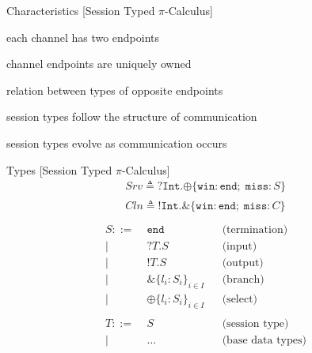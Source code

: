 \documentclass[dvipsnames]{beamer}
\newcommand{\Picalc}{$\pi$-Calculus}
\newcommand{\type}[1]{\mathtt{#1}}
\newcommand{\tend}[0]{\type{end}}
\newcommand{\trecv}[1]{\type{?} #1 \type{.}}
\newcommand{\tsend}[1]{\type{!} #1 \type{.}}
\newcommand{\tbranch}[2]{\type{\&} \{ #1 \}_{#2}}
\newcommand{\tselect}[2]{\type{\oplus} \{ #1 \}_{#2}}
\newcommand{\is}[0]{\triangleq}
\newcommand{\slidetitle}[2]{#2 \hspace*{\fill} [#1]}
\begin{document}
  \begin{frame}{\slidetitle{Session Typed \Picalc{}}{Characteristics}}
    \begin{description}
      \setlength\itemsep{1em}
      \item[endpoints] each channel has two endpoints
      \item[linearity] channel endpoints are uniquely owned
      \item[duality] relation between types of opposite endpoints
      \item[structure] session types follow the structure of communication
      \item[change] session types evolve as communication occurs
    \end{description}
  \end{frame}

  \begin{frame}{\slidetitle{Session Typed \Picalc{}}{Types}}
    \setlength{\abovedisplayskip}{0pt}
    \setlength{\belowdisplayskip}{0pt}
    \setlength{\abovedisplayshortskip}{0pt}
    \setlength{\belowdisplayshortskip}{0pt}
    \begin{align*}
      Srv \is \trecv{\mathtt{Int}} \tselect{\mathtt{win} : \tend ; \; \mathtt{miss} : S}{} \\
      Cln \is \tsend{\mathtt{Int}} \tbranch{\mathtt{win} : \tend ; \; \mathtt{miss} : C}{} \\
    \end{align*}
    \begin{align*}
      S ::=& \; \tend      &&\text{(termination)}    \\ 
      |& \; \trecv{T}S     &&\text{(input)}       \\ 
      |& \; \tsend{T}S     &&\text{(output)}       \\           
      |& \; \tbranch{l_i : S_i}{i \in I} &&\text{(branch)}       \\ 
      |& \; \tselect{l_i : S_i}{i \in I} &&\text{(select)}       \\           
      \\
      T ::=& \; S      &&\text{(session type)} \\
      | & \; \ldots      &&\text{(base data types)} \\
    \end{align*}
  \end{frame}
\end{document}
